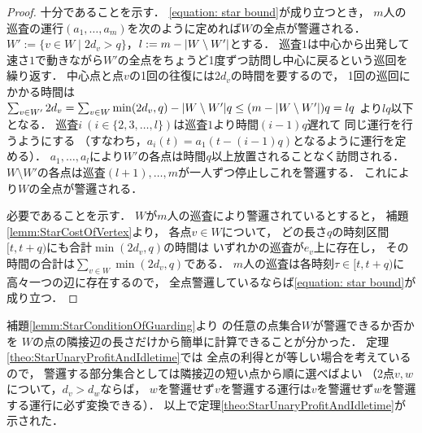 \begin{proof}
  十分であることを示す．
  \eqref{equation: star bound}が成り立つとき，
  $m$人の巡査の運行$(a_1, \ldots, a_m)$を次のように定めれば$W$の全点が警邏される．
  $W' := \{ v \in W \mid 2d_v > q \}$，$l := m - \lvert{W \setminus W'}\rvert$とする．
  巡査$1$は中心から出発して速さ$1$で動きながら$W'$の全点をちょうど1度ずつ訪問し中心に戻るという巡回を繰り返す．
  中心点と点$v$の1回の往復には$2d_v$の時間を要するので，
  1回の巡回にかかる時間は
  $\sum_{v \in W'} 2d_v
    = \sum_{v \in W} \min(2d_v, q) - \lvert{W \setminus W'}\rvert q
    \leq (m - \lvert{W \setminus W'}\rvert)q = lq$%
  より$lq$以下となる．
  巡査$i\ (i \in \{ 2, 3, \ldots, l \})$は巡査$1$より時間$(i - 1)q$遅れて
  同じ運行を行うようにする
  （すなわち，$a_i(t) = a_1(t - (i - 1)q)$となるように運行を定める）．
  $a_1, \ldots, a_l$により$W'$の各点は時間$q$以上放置されることなく訪問される．
  $W \setminus W'$の各点は巡査$(l + 1), \ldots, m$が一人ずつ停止しこれを警邏する．
  これにより$W$の全点が警邏される．

  必要であることを示す．
  $W$が$m$人の巡査により警邏されているとすると，
  補題\ref{lemm:StarCostOfVertex}より，
  各点$v \in W$について，
  どの長さ$q$の時刻区間$[t, t + q)$にも合計$\min(2d_v, q)$の時間は
  いずれかの巡査が$e_v$上に存在し，
  その時間の合計は$\sum_{v \in W} \min(2d_v, q)$である．
  $m$人の巡査は各時刻$\tau \in [t, t + q)$に高々一つの辺に存在するので，
  全点警邏しているならば\eqref{equation: star bound}が成り立つ．
\end{proof}


補題\ref{lemm:StarConditionOfGuarding}より
{\graphStar}の任意の点集合$W$が警邏できるか否かを
$W$の点の隣接辺の長さだけから簡単に計算できることが分かった．
定理\ref{theo:StarUnaryProfitAndIdletime}では
全点の利得と{\maxIdletime}が等しい場合を考えているので，
警邏する部分集合としては隣接辺の短い点から順に選べばよい
（2点$v, w$について，$d_v > d_w$ならば，
$w$を警邏せず$v$を警邏する運行は$v$を警邏せず$w$を警邏する運行に必ず変換できる）．
以上で定理\ref{theo:StarUnaryProfitAndIdletime}が示された．
